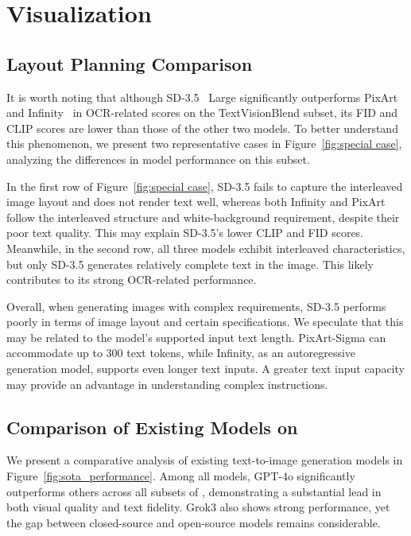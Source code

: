 % 


\section{Visualization}


\subsection{Layout Planning Comparison}
It is worth noting that although SD-3.5~\cite{sd3} Large significantly outperforms PixArt~\cite{pixart} and Infinity~\cite{han2024infinity} in OCR-related scores on the TextVisionBlend subset, its FID and CLIP scores are lower than those of the other two models. To better understand this phenomenon, we present two representative cases in Figure~\ref{fig:special case}, analyzing the differences in model performance on this subset.

In the first row of Figure~\ref{fig:special case}, SD-3.5 fails to capture the interleaved image layout and does not render text well, whereas both Infinity and PixArt follow the interleaved structure and white-background requirement, despite their poor text quality. This may explain SD-3.5’s lower CLIP and FID scores. Meanwhile, in the second row, all three models exhibit interleaved characteristics, but only SD-3.5 generates relatively complete text in the image. This likely contributes to its strong OCR-related performance.

Overall, when generating images with complex requirements, SD-3.5 performs poorly in terms of image layout and certain specifications. We speculate that this may be related to the model's supported input text length. PixArt-Sigma can accommodate up to 300 text tokens, while Infinity, as an autoregressive generation model, supports even longer text inputs. A greater text input capacity may provide an advantage in understanding complex instructions.


\subsection{Comparison of Existing Models on \EvalDatasetName}

We present a comparative analysis of existing text-to-image generation models in Figure~\ref{fig:sota_performance}.
Among all models, GPT-4o significantly outperforms others across all subsets of \EvalDatasetName, demonstrating a substantial lead in both visual quality and text fidelity. Grok3 also shows strong performance, yet the gap between closed-source and open-source models remains considerable.

